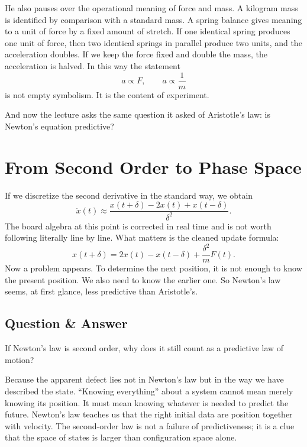 He also pauses over the operational meaning of force and mass. A kilogram mass is identified by comparison with a standard mass. A spring balance gives meaning to a unit of force by a fixed amount of stretch. If one identical spring produces one unit of force, then two identical springs in parallel produce two units, and the acceleration doubles. If we keep the force fixed and double the mass, the acceleration is halved. In this way the statement
\begin{equation}
a\propto F,\qquad a\propto \frac{1}{m}
\end{equation}
is not empty symbolism. It is the content of experiment.

And now the lecture asks the same question it asked of Aristotle's law: is Newton's equation predictive?

\section{From Second Order to Phase Space}

If we discretize the second derivative in the standard way, we obtain
\begin{equation}
\ddot x(t)\approx \frac{x(t+\delta)-2x(t)+x(t-\delta)}{\delta^2}.
\end{equation}
The board algebra at this point is corrected in real time and is not worth following literally line by line. What matters is the cleaned update formula:
\begin{equation}
x(t+\delta)=2x(t)-x(t-\delta)+\frac{\delta^2}{m}F(t).
\end{equation}
Now a problem appears. To determine the next position, it is not enough to know the present position. We also need to know the earlier one. So Newton's law seems, at first glance, less predictive than Aristotle's.

\subsection{Question \& Answer}

If Newton's law is second order, why does it still count as a predictive law of motion?

Because the apparent defect lies not in Newton's law but in the way we have described the state. ``Knowing everything'' about a system cannot mean merely knowing its position. It must mean knowing whatever is needed to predict the future. Newton's law teaches us that the right initial data are position together with velocity. The second-order law is not a failure of predictiveness; it is a clue that the space of states is larger than configuration space alone.

